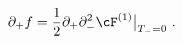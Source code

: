 \begin{equation}\label{fFA}
\partial_{+}
f=
\frac{1}{2}\partial_{+}\partial^{2}_{-}\cF^{(1)}\big|_{T_{-}=0}\ .
\end{equation}

